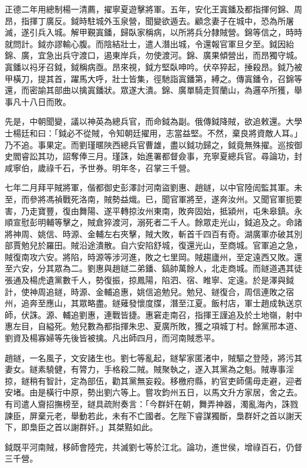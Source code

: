 \begin{pinyinscope}
正德二年用總制楊一清薦，擢寧夏遊擊將軍。五年，安化王寘鐇及都指揮何錦、周昂，指揮丁廣反。鉞時駐城外玉泉營，聞變欲遁去。顧念妻子在城中，恐為所屠滅，遂引兵入城。解甲覲寘鐇，歸臥家稱病，以所將兵分隸賊營。錦等信之，時時就問計。鉞亦謬輸心腹。而陰結壯士，遣人潛出城，令還報官軍旦夕至。鉞因紿錦、廣，宜急出兵守渡口，遏東岸兵，勿使渡河。錦、廣果傾營出，而昂獨守城。寘鐇以祃牙召鉞，鉞稱病亟。昂來視，鉞方堅臥呻吟。伏卒猝起，捶殺昂。鉞乃被甲橫刀，提其首，躍馬大呼，壯士皆集，徑馳詣寘鐇第，縛之。傳寘鐇令，召錦等還，而密諭其部曲以擒寘鐇狀。眾遂大潰。錦、廣單騎走賀蘭山，為邏卒所獲，舉事凡十八日而敗。

先是，中朝聞變，議以神英為總兵官，而命鉞為副。俄傳鉞降賊，欲追敕還。大學士楊廷和曰：「鉞必不從賊，令知朝廷擢用，志當益堅。不然，棄良將資敵人耳。」乃不追。事果定。而劉瑾暱陜西總兵官曹雄，盡以鉞功歸之，鉞竟無殊擢。巡按御史閻睿訟其功，詔奪俸三月。瑾誅，始進署都督僉事，充寧夏總兵官。尋論功，封咸寧伯，歲祿千石，予世券。明年冬，召掌三千營。

七年二月拜平賊將軍，偕都御史彭澤討河南盜劉惠、趙鐩，以中官陸訚監其軍。未至，而參將馮禎戰死洛南，賊勢益熾。已，聞官軍將至，遂奔汝州。又聞官軍扼要害，乃走寶豐，復由舞陽、遂平轉掠汝州東南，敗奔固始，抵潁州，屯朱皋鎮。永順宣慰彭明輔等擊之，賊倉猝渡河，溺死者二千人。餘眾走光山，鉞追及之。命諸將神周、姚信、時源、金輔左右夾擊，賊大敗，斬首千四百有奇。湖廣軍亦破其別部賈勉兒於羅田。賊沿途潰散。自六安陷舒城，復還光山，至商城。官軍追之急，賊復南攻六安。將陷，時源等涉河進，敗之七里岡。賊趨廬州，至定遠西又敗。還至六安，分其眾為二。劉惠與趙鐩二弟鐇、鎬帥萬餘人，北走商城。而鐩道遇其徒張通及楊虎遺黨數千人，勢復振，掠鳳陽，陷泗、宿、睢寧、定遠。於是澤與鉞計，使神周追鐩，時源、金輔追惠，姚信追勉兒。勉兒、鐩復合，周信連敗之宿州，追奔至應山，其眾略盡。鐩薙發懷度牒，潛至江夏。飯村店，軍士趙成執送京師，伏誅。源、輔追劉惠，連戰皆捷。惠窘走南召，指揮王謹追及於土地嶺，射中惠左目，自縊死。勉兒數為都指揮朱忠、夏廣所敗，獲之項城丁村。餘黨邢本道、劉資及楊寡婦等先後皆被擒。凡出師四月，而河南賊悉平。

趙鐩，一名風子，文安諸生也。劉七等亂起，鐩挈家匿渚中，賊驅之登陸，將污其妻女。鐩素驍健，有膂力，手格殺二賊。賊聚執之，遂入其黨為之魁。賊專事淫掠，鐩稍有智計，定為部伍，勸其黨無妄殺。移檄府縣，約官吏師儒毋走避，迎者安堵。由是橫行中原，勢出劉六等上。嘗攻鈞州五日，以馬文升方家居，舍之去。有司遣人齎招撫榜至，鐩具疏附奏言：「今群奸在朝，舞弄神器，濁亂海內，誅戮諫臣，屏棄元老，舉動若此，未有不亡國者。乞陛下睿謀獨斷，梟群奸之首以謝天下，即梟臣之首以謝群奸。」其桀黠如此。

鉞既平河南賊，移師會陸完，共滅劉七等於江北。論功，進世侯，增祿百石，仍督三千營。


\end{pinyinscope}
